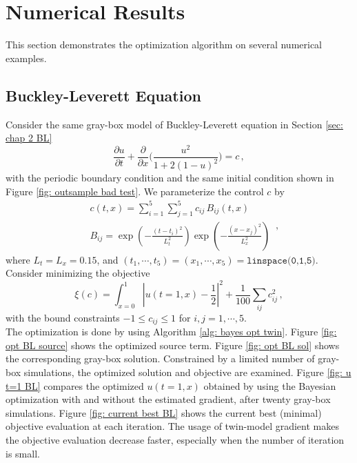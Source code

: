 \section{Numerical Results}
\label{sec: chap3 numerical}
This section demonstrates the optimization algorithm on several numerical examples.

\subsection{Buckley-Leverett Equation}
Consider the same gray-box model of Buckley-Leverett equation in Section \ref{sec: chap 2 BL}
\begin{equation*}
    \frac{\partial u}{\partial t} + \frac{\partial}{\partial x}\Big(
    \frac{u^2}{1+ 2(1-u)^2} \Big) = c\,,
\end{equation*}
with the periodic boundary condition and the same initial condition shown in 
Figure \ref{fig: outsample bad test}.
We parameterize the control $c$ by
\begin{equation}\begin{split}
    &c(t,x) = \sum_{i=1}^5 \sum_{j=1}^5 c_{ij} \, B_{ij}(t,x)\\
    &B_{ij} = \exp\left(-\frac{(t-t_i)^2}{L_t^2}\right)
    \exp\left(-\frac{(x-x_j)^2}{L_x^2}\right)
\end{split} \,, \end{equation}
where $L_t=L_x=0.15$, and $(t_1, \cdots, t_5) =
(x_1, \cdots, x_5) =\texttt{linspace(0,1,5)}$.
Consider minimizing the objective
\begin{equation}
    \xi(c) = \int_{x=0}^1 \left| u(t=1,x) -  \frac{1}{2}\right|^2 + \frac{1}{100}\sum_{ij} c_{ij}^2
    \,,
    \label{eqn: chap 3 BL obj fun}
\end{equation}
with the bound constraints $-1 \le c_{ij}\le 1$ for $i,j=1,\cdots, 5$.\\

The optimization is done by using Algorithm \ref{alg: bayes opt twin}.
Figure \ref{fig: opt BL source} shows the optimized source term.
Figure \ref{fig: opt BL sol} shows the corresponding gray-box solution.
Constrained by a limited number of gray-box simulations,
the optimized solution and objective are examined.
Figure \ref{fig: u t=1 BL} 
compares the optimized $u(t=1,x)$ obtained by using the Bayesian optimization with
and without the estimated gradient, after twenty gray-box simulations.
Figure \ref{fig: current best BL} shows the current best (minimal) objective evaluation at
each iteration. The usage of twin-model gradient makes the objective evaluation decrease 
faster, especially when the number of iteration is small.


